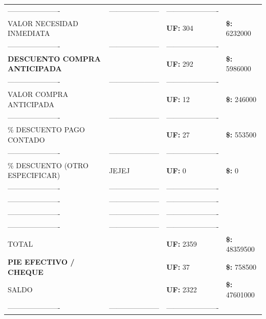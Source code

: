 \documentclass[10pt]{article}
\begin{document}
\begin{tabular}{llll}
\hline
\color{white}---------------------- & \color{white}--------------------- & \color{white}---------------------- \\
VALOR NECESIDAD INMEDIATA &  & \textbf{UF: } 304 & \textbf{\$: }6232000 \\ 
\color{white}---------------------- & \color{white}--------------------- & \color{white}---------------------- \\
\textbf{DESCUENTO COMPRA ANTICIPADA} & & \textbf{UF: }292& \textbf{\$: }5986000 \\ 
\color{white}---------------------- & \color{white}--------------------- & \color{white}---------------------- \\
VALOR COMPRA ANTICIPADA &  & \textbf{UF: }12& \textbf{\$: }246000 \\  
\color{white}---------------------- & \color{white}--------------------- & \color{white}---------------------- \\
\% DESCUENTO PAGO CONTADO &  & \textbf{UF: }27& \textbf{\$: }553500 \\  
\color{white}---------------------- & \color{white}--------------------- & \color{white}---------------------- \\
\% DESCUENTO (OTRO ESPECIFICAR) &JEJEJ& \textbf{UF: }0& \textbf{\$: }0 \\  
\color{white}---------------------- & \color{white}--------------------- & \color{white}---------------------- \\
\color{white}---------------------- & \color{white}--------------------- & \color{white}---------------------- \\
\color{white}---------------------- & \color{white}--------------------- & \color{white}---------------------- \\
\color{white}---------------------- & \color{white}--------------------- & \color{white}---------------------- \\
TOTAL &  & \textbf{UF: }2359& \textbf{\$: }48359500 \\  
\textbf{PIE EFECTIVO / CHEQUE} &  & \textbf{UF: }37& \textbf{\$: }758500 \\   
SALDO &  & \textbf{UF: }2322 & \textbf{\$: } 47601000 \\  
\color{white}---------------------- & \color{white}--------------------- & \color{white}---------------------- \\
\hline
\end{tabular}
\end{document}
